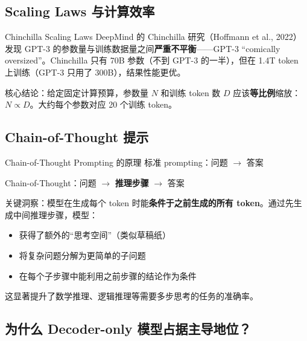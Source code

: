 \documentclass[a4paper]{article}
\begin{document}
\subsection{Scaling Laws 与计算效率}




\begin{knowledgebox}{Chinchilla Scaling Laws}
DeepMind 的 Chinchilla 研究（Hoffmann et al., 2022）发现 GPT-3 的参数量与训练数据量之间\textbf{严重不平衡}——GPT-3 ``comically oversized''。Chinchilla 只有 70B 参数（不到 GPT-3 的一半），但在 1.4T token 上训练（GPT-3 只用了 300B），结果性能更优。

核心结论：给定固定计算预算，参数量 $N$ 和训练 token 数 $D$ 应该\textbf{等比例}缩放：$N \propto D$。大约每个参数对应 20 个训练 token。
\end{knowledgebox}

\subsection{Chain-of-Thought 提示}




\begin{importantbox}{Chain-of-Thought Prompting 的原理}
标准 prompting：问题 $\rightarrow$ 答案

Chain-of-Thought：问题 $\rightarrow$ \textbf{推理步骤} $\rightarrow$ 答案

关键洞察：模型在生成每个 token 时能\textbf{条件于之前生成的所有 token}。通过先生成中间推理步骤，模型：
\begin{itemize}
    \item 获得了额外的``思考空间''（类似草稿纸）
    \item 将复杂问题分解为更简单的子问题
    \item 在每个子步骤中能利用之前步骤的结论作为条件
\end{itemize}
这显著提升了数学推理、逻辑推理等需要多步思考的任务的准确率。
\end{importantbox}

\subsection{为什么 Decoder-only 模型占据主导地位？}
\end{document}
